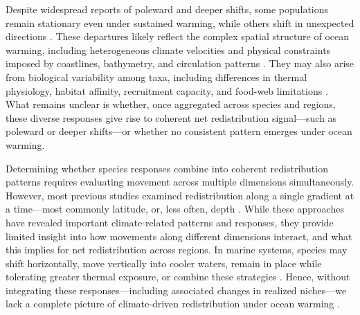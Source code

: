 \documentclass[9pt,twocolumn,twoside]{pnas-new}
\begin{document}
Despite widespread reports of poleward and deeper shifts, some populations remain stationary even under sustained warming, while others shift in unexpected directions \citep{rubenstein_climate_2023, fuchs_wrong-way_2020, lawlor_mechanisms_2024}. These departures likely reflect the complex spatial structure of ocean warming, including heterogeneous climate velocities and physical constraints imposed by coastlines, bathymetry, and circulation patterns \citep{burrows_pace_2011, pinsky_marine_2013}. They may also arise from biological variability among taxa, including differences in thermal physiology, habitat affinity, recruitment capacity, and food-web limitations \citep{sunday_species_2015, roberts_substrate-dependent_2020, britten_changing_2016, zhang_food-web_2017}. What remains unclear is whether, once aggregated across species and regions, these diverse responses give rise to coherent net redistribution signal---such as poleward or deeper shifts---or whether no consistent pattern emerges under ocean warming.

\Endparasplit

Determining whether species responses combine into coherent redistribution patterns requires evaluating movement across multiple dimensions simultaneously. However, most previous studies examined redistribution along a single gradient at a time---most commonly latitude, or, less often, depth \citep{lenoir_climate-related_2015}. While these approaches have revealed important climate-related patterns and responses, they provide limited insight into how movements along different dimensions interact, and what this implies for net redistribution across regions. In marine systems, species may shift horizontally, move vertically into cooler waters, remain in place while tolerating greater thermal exposure, or combine these strategies \citep{nye_changing_2009}. Hence, without integrating these responses---including associated changes in realized niches---we lack a complete picture of climate-driven redistribution under ocean warming \citep{lawlor_mechanisms_2024, fredston_reimagining_2025}.
\end{document}

